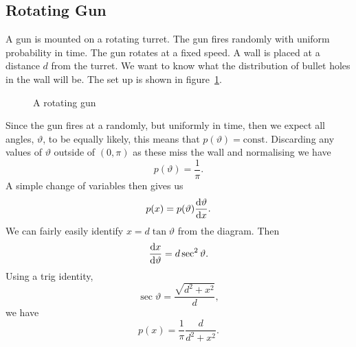 \documentclass[a4paper]{article}
\begin{document}
    \subsection{Rotating Gun}
    A gun is mounted on a rotating turret.
    The gun fires randomly with uniform probability in time.
    The gun rotates at a fixed speed.
    A wall is placed at a distance \(d\) from the turret.
    We want to know what the distribution of bullet holes in the wall will be.
    The set up is shown in figure~\ref{fig:rotating gun}.
    \begin{figure}[ht]
        \centering
        \caption{A rotating gun}
        \label{fig:rotating gun}
    \end{figure}
    Since the gun fires at a randomly, but uniformly in time, then we expect all angles, \(\vartheta\), to be equally likely, this means that \(p(\vartheta) = \mathrm{const}\).
    Discarding any values of \(\vartheta\) outside of \((0, \pi)\) as these miss the wall and normalising we have
    \[p(\vartheta) = \frac{1}{\pi}.\]
    A simple change of variables then gives us
    \[p(x) = p(\vartheta)\dv{\vartheta}{x}.\]
    We can fairly easily identify \(x = d\tan\vartheta\) from the diagram.
    Then
    \[\dv{x}{\vartheta} = d\sec^2\vartheta.\]
    Using a trig identity,
    \[\sec\vartheta = \frac{\sqrt{d^2 + x^2}}{d},\]
    we have
    \[p(x) = \frac{1}{\pi}\frac{d}{d^2 + x^2}.\]
    
\end{document}
